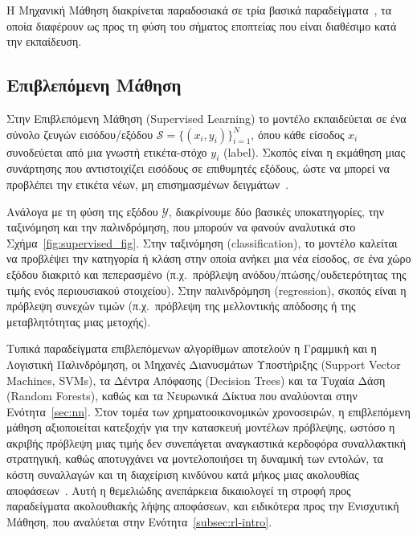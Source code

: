 Η Μηχανική Μάθηση διακρίνεται παραδοσιακά σε τρία βασικά παραδείγματα~\cite{russell2020ai,bishop2006}, τα
οποία διαφέρουν ως προς τη φύση του σήματος εποπτείας που είναι διαθέσιμο κατά
την εκπαίδευση.


\subsection{Επιβλεπόμενη Μάθηση}
\label{subsec:supervised}

Στην Επιβλεπόμενη Μάθηση (Supervised Learning) το
μοντέλο εκπαιδεύεται σε ένα σύνολο ζευγών εισόδου/εξόδου
$\mathcal{S} = \{(x_i, y_i)\}_{i=1}^{N}$, όπου κάθε είσοδος $x_i$ συνοδεύεται
από μια γνωστή ετικέτα-στόχο $y_i$ (label). Σκοπός
είναι η εκμάθηση μιας συνάρτησης που αντιστοιχίζει εισόδους σε επιθυμητές
εξόδους, ώστε να μπορεί να προβλέπει την ετικέτα νέων, μη επισημασμένων
δειγμάτων~\cite{bishop2006}.

Ανάλογα με τη φύση της εξόδου $\mathcal{Y}$, διακρίνουμε δύο βασικές υποκατηγορίες,
την ταξινόμηση και την παλινδρόμηση, που μπορούν να φανούν αναλυτικά 
στο Σχήμα~\ref{fig:supervised_fig}. Στην ταξινόμηση (classification),
το μοντέλο καλείται να προβλέψει την κατηγορία ή
κλάση στην οποία ανήκει μια νέα είσοδος, σε ένα χώρο εξόδου διακριτό 
και πεπερασμένο (π.χ.\ πρόβλεψη ανόδου/πτώσης/ουδετερότητας της τιμής ενός περιουσιακού στοιχείου).
Στην παλινδρόμηση (regression), σκοπός είναι η πρόβλεψη συνεχών τιμών
 (π.χ.\ πρόβλεψη της μελλοντικής απόδοσης ή της μεταβλητότητας μιας μετοχής).

Τυπικά παραδείγματα επιβλεπόμενων αλγορίθμων αποτελούν η Γραμμική και η
Λογιστική Παλινδρόμηση, οι Μηχανές Διανυσμάτων Υποστήριξης
(Support Vector Machines, SVMs), τα Δέντρα Απόφασης (Decision Trees) και
τα Τυχαία Δάση (Random Forests), καθώς και τα
Νευρωνικά Δίκτυα που αναλύονται στην Ενότητα~\ref{sec:nn}. Στον τομέα των
χρηματοοικονομικών χρονοσειρών, η επιβλεπόμενη μάθηση αξιοποιείται κατεξοχήν
για την κατασκευή μοντέλων πρόβλεψης, ωστόσο η ακριβής πρόβλεψη μιας τιμής
δεν συνεπάγεται αναγκαστικά κερδοφόρα συναλλακτική στρατηγική, καθώς αποτυγχάνει να
μοντελοποιήσει τη δυναμική των εντολών, τα κόστη συναλλαγών και τη διαχείριση
κινδύνου κατά μήκος μιας ακολουθίας αποφάσεων~\cite{hambly2023rlfinance}. Αυτή η θεμελιώδης ανεπάρκεια
δικαιολογεί τη στροφή προς παραδείγματα ακολουθιακής λήψης αποφάσεων,
και ειδικότερα προς την Ενισχυτική Μάθηση, που αναλύεται στην
Ενότητα~\ref{subsec:rl-intro}.

